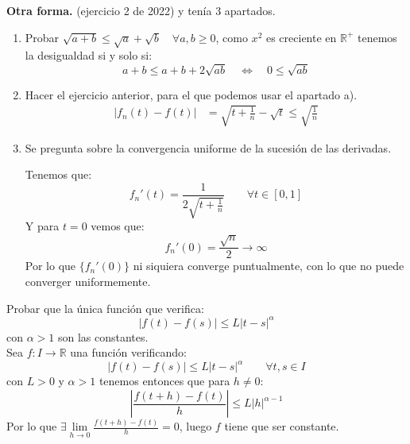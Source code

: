 \begin{ejercicio}
    \noindent
    \textbf{Otra forma.} (ejercicio 2 de 2022) y tenía 3 apartados.
    \begin{enumerate}[label=\alph*)]
        \item Probar $\sqrt{a+b}\leq \sqrt{a}+\sqrt{b}\quad \forall a,b\geq 0$, como $x^2$ es creciente en $\mathbb{R}^+$ tenemos la desigualdad si y solo si:
            \begin{equation*}
                a+b \leq a+b+2\sqrt{ab} \quad\Longleftrightarrow\quad 0 \leq \sqrt{ab}
            \end{equation*}
        \item Hacer el ejercicio anterior, para el que podemos usar el apartado a).
            \begin{align*}
                |f_n(t) - f(t)| &= \sqrt{t+\frac{1}{n}} - \sqrt{t} \leq \sqrt{\frac{1}{n}}
            \end{align*}
        \item Se pregunta sobre la convergencia uniforme de la sucesión de las derivadas.

            Tenemos que:
            \begin{equation*}
                f_n'(t) = \frac{1}{2\sqrt{t+\frac{1}{n}}} \qquad \forall t\in [0,1]
            \end{equation*}
            Y para $t=0$ vemos que:
            \begin{equation*}
                f_n'(0) = \frac{\sqrt{n}}{2} \to \infty
            \end{equation*}
            Por lo que $\{f_n'(0)\}$ ni siquiera converge puntualmente, con lo que no puede converger uniformemente.
    \end{enumerate}
\end{ejercicio}

\begin{ejercicio} %
    Probar que la única función que verifica:
    \begin{equation*}
        |f(t)-f(s)| \leq L|t-s|^\alpha
    \end{equation*}
    con $\alpha>1$ son las constantes.\\

    \noindent
    Sea $f:I\to \mathbb{R}$ una función verificando:
    \begin{equation*}
        |f(t)-f(s)| \leq L|t-s|^\alpha \qquad \forall t,s\in I
    \end{equation*}
    con $L>0$ y $\alpha>1$ tenemos entonces que para $h\neq 0$:
    \begin{equation*}
        \left|\frac{f(t+h)-f(t)}{h}\right| \leq L|h|^{\alpha-1}
    \end{equation*}
    Por lo que $\exists \lim\limits_{h\to0}\frac{f(t+h)-f(t)}{h} = 0$, luego $f$ tiene que ser constante.
\end{ejercicio}


